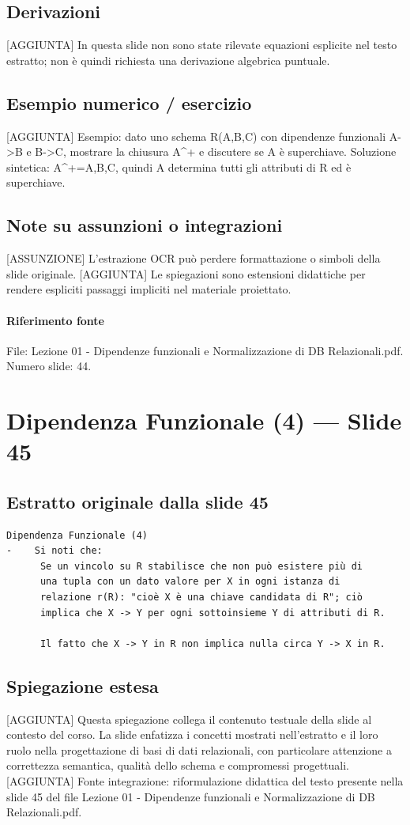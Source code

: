 \documentclass[11pt]{article}
\begin{document}
\subsection*{Derivazioni}
[AGGIUNTA] In questa slide non sono state rilevate equazioni esplicite nel testo estratto; non è quindi richiesta una derivazione algebrica puntuale.
\subsection*{Esempio numerico / esercizio}
[AGGIUNTA] Esempio: dato uno schema R(A,B,C) con dipendenze funzionali A->B e B->C, mostrare la chiusura A^+ e discutere se A è superchiave. Soluzione sintetica: A^+={A,B,C}, quindi A determina tutti gli attributi di R ed è superchiave.
\subsection*{Note su assunzioni o integrazioni}
[ASSUNZIONE] L'estrazione OCR può perdere formattazione o simboli della slide originale.
[AGGIUNTA] Le spiegazioni sono estensioni didattiche per rendere espliciti passaggi impliciti nel materiale proiettato.
\paragraph{Riferimento fonte} File: Lezione 01 - Dipendenze funzionali e Normalizzazione di DB Relazionali.pdf. Numero slide: 44.
\section{Dipendenza Funzionale (4) --- Slide 45}
\subsection*{Estratto originale dalla slide 45}
\begin{lstlisting}
Dipendenza Funzionale (4)
-    Si noti che:
      Se un vincolo su R stabilisce che non può esistere più di
      una tupla con un dato valore per X in ogni istanza di
      relazione r(R): "cioè X è una chiave candidata di R"; ciò
      implica che X -> Y per ogni sottoinsieme Y di attributi di R.

      Il fatto che X -> Y in R non implica nulla circa Y -> X in R.
\end{lstlisting}
\subsection*{Spiegazione estesa}
[AGGIUNTA] Questa spiegazione collega il contenuto testuale della slide al contesto del corso. La slide enfatizza i concetti mostrati nell'estratto e il loro ruolo nella progettazione di basi di dati relazionali, con particolare attenzione a correttezza semantica, qualità dello schema e compromessi progettuali.
[AGGIUNTA] Fonte integrazione: riformulazione didattica del testo presente nella slide 45 del file Lezione 01 - Dipendenze funzionali e Normalizzazione di DB Relazionali.pdf.
\end{document}
